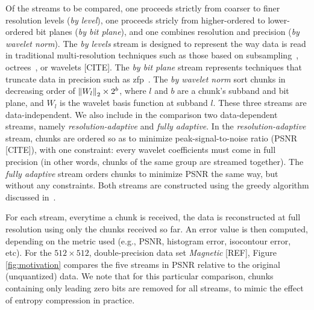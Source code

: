   Of the streams to be
compared, one proceeds strictly from coarser to finer resolution
levels (\emph{by level}), one proceeds stricly from higher-ordered to
lower-ordered bit planes (\emph{by bit plane}), and one combines
resolution and precision (\emph{by wavelet norm}). The \emph{by
  levels} stream is designed to represent the way data is read in
traditional multi-resolution techniques such as those based on
subsampling~\cite{idx2001}, octrees~\cite{multires_octree1999}, or
wavelets [CITE]. The \emph{by bit plane} stream represents techniques
that truncate data in precision such as zfp~\cite{zfp2014}.  The
\emph{by wavelet norm} sort chunks in decreasing order of
$\left\lVert W_l\right\rVert_2 \times 2^b$, where $l$ and $b$ are a chunk's subband and
bit plane, and $W_l$ is the wavelet basis function at subband $l$.
These three streams are data-independent. We also include in the
comparison two data-dependent streams, namely
\emph{resolution-adaptive} and \emph{fully adaptive}. In the
\emph{resolution-adaptive} stream, chunks are ordered so as to
minimize peak-signal-to-noise ratio (PSNR [CITE]), with one
constraint: every wavelet coefficients must come in full precision (in
other words, chunks of the same group are streamed together). The
\emph{fully adaptive} stream orders chunks to minimize PSNR the same
way, but without any constraints. Both streams are constructed using
the greedy algorithm discussed in~.

For each stream, everytime a chunk is received, the data is reconstructed at full resolution using
only the chunks received so far. An error value is then computed, depending on the metric used
(e.g., PSNR, histogram error, isocontour error, etc). For the $512 \times 512$, double-precision
data set \emph{Magnetic} [REF], Figure \ref{fig:motivation} compares the five streams in
PSNR relative to the original (unquantized) data. We note that for this particular comparison,
chunks containing only leading zero bits are removed for all streams, to mimic the effect of entropy
compression in practice.

